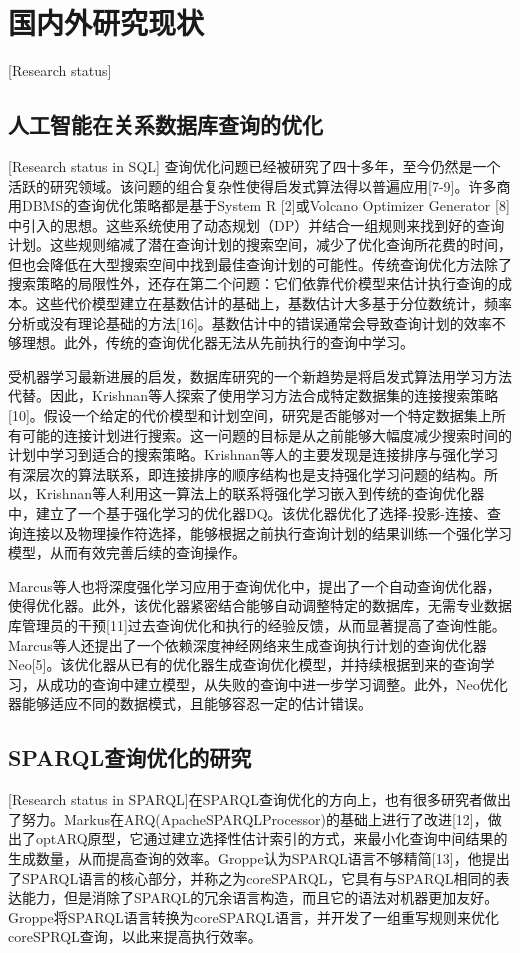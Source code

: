 \section{国内外研究现状}[Research status]

\subsection{人工智能在关系数据库查询的优化}[Research status in SQL]
查询优化问题已经被研究了四十多年，至今仍然是一个活跃的研究领域。该问题的组合复杂性使得启发式算法得以普遍应用[7-9]。许多商用DBMS的查询优化策略都是基于System R [2]或Volcano Optimizer Generator [8]中引入的思想。这些系统使用了动态规划（DP）并结合一组规则来找到好的查询计划。这些规则缩减了潜在查询计划的搜索空间，减少了优化查询所花费的时间，但也会降低在大型搜索空间中找到最佳查询计划的可能性。传统查询优化方法除了搜索策略的局限性外，还存在第二个问题：它们依靠代价模型来估计执行查询的成本。这些代价模型建立在基数估计的基础上，基数估计大多基于分位数统计，频率分析或没有理论基础的方法[16]。基数估计中的错误通常会导致查询计划的效率不够理想。此外，传统的查询优化器无法从先前执行的查询中学习。

受机器学习最新进展的启发，数据库研究的一个新趋势是将启发式算法用学习方法代替。因此，Krishnan等人探索了使用学习方法合成特定数据集的连接搜索策略[10]。假设一个给定的代价模型和计划空间，研究是否能够对一个特定数据集上所有可能的连接计划进行搜索。这一问题的目标是从之前能够大幅度减少搜索时间的计划中学习到适合的搜索策略。Krishnan等人的主要发现是连接排序与强化学习有深层次的算法联系，即连接排序的顺序结构也是支持强化学习问题的结构。所以，Krishnan等人利用这一算法上的联系将强化学习嵌入到传统的查询优化器中，建立了一个基于强化学习的优化器DQ。该优化器优化了选择-投影-连接、查询连接以及物理操作符选择，能够根据之前执行查询计划的结果训练一个强化学习模型，从而有效完善后续的查询操作。

Marcus等人也将深度强化学习应用于查询优化中，提出了一个自动查询优化器，使得优化器。此外，该优化器紧密结合能够自动调整特定的数据库，无需专业数据库管理员的干预[11]过去查询优化和执行的经验反馈，从而显著提高了查询性能。Marcus等人还提出了一个依赖深度神经网络来生成查询执行计划的查询优化器Neo[5]。该优化器从已有的优化器生成查询优化模型，并持续根据到来的查询学习，从成功的查询中建立模型，从失败的查询中进一步学习调整。此外，Neo优化器能够适应不同的数据模式，且能够容忍一定的估计错误。

\subsection{SPARQL查询优化的研究}[Research status in SPARQL]在SPARQL查询优化的方向上，也有很多研究者做出了努力。Markus在ARQ(ApacheSPARQLProcessor)的基础上进行了改进[12]，做出了optARQ原型，它通过建立选择性估计索引的方式，来最小化查询中间结果的生成数量，从而提高查询的效率。Groppe认为SPARQL语言不够精简[13]，他提出了SPARQL语言的核心部分，并称之为coreSPARQL，它具有与SPARQL相同的表达能力，但是消除了SPARQL的冗余语言构造，而且它的语法对机器更加友好。Groppe将SPARQL语言转换为coreSPARQL语言，并开发了一组重写规则来优化coreSPRQL查询，以此来提高执行效率。

